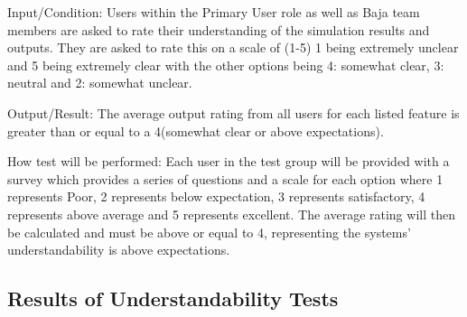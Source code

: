 \documentclass[12pt, titlepage]{article}
\begin{document}
\begin{enumerate}
  Input/Condition: Users within the Primary User role as well as Baja team members are asked to rate their understanding of the simulation results and outputs. 
  They are asked to rate this on a scale of (1-5) 1 being extremely unclear and 5 being extremely clear with the other options being 4: somewhat clear, 3: neutral and 2: somewhat unclear. 
            
  Output/Result: The average output rating from all users for each listed feature is greater than or equal to a 4(somewhat clear or above expectations).
            
  How test will be performed: Each user in the test group will be provided with a survey which provides a series of questions and a scale for each option where 1 represents Poor, 2 represents below expectation, 3 represents satisfactory, 4 represents above average and 5 represents excellent.
  The average rating will then be calculated and must be above or equal to 4, representing the systems' understandability is above expectations. 
  
  \end{enumerate}

  \subsection{Results of Understandability Tests}
\end{document}
